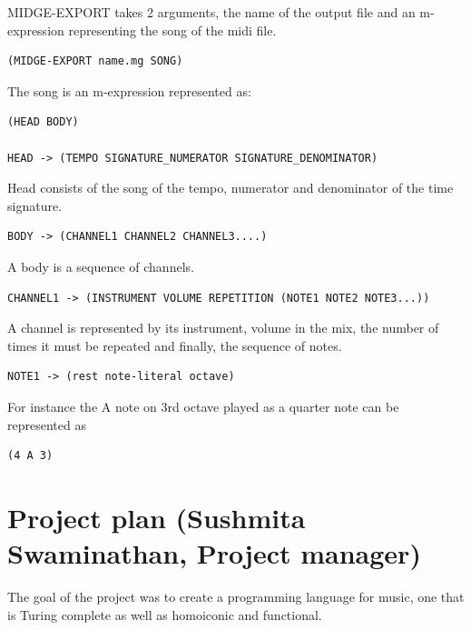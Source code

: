 \documentclass[letterpaper,11pt]{article}
\begin{document}
{MIDGE-EXPORT takes 2 arguments, the name of the output file and an m-expression representing the song of the midi file. 

\lstset{breaklines=true,language=Lisp}
\begin{lstlisting}
(MIDGE-EXPORT name.mg SONG)
\end{lstlisting}
The song is an m-expression represented as:

\lstset{breaklines=true,language=Lisp}
\begin{lstlisting}
(HEAD BODY)

HEAD -> (TEMPO SIGNATURE_NUMERATOR SIGNATURE_DENOMINATOR)
\end{lstlisting}

Head consists of the song of the tempo, numerator and denominator of the time signature.

\lstset{breaklines=true,language=Lisp}
\begin{lstlisting}
BODY -> (CHANNEL1 CHANNEL2 CHANNEL3....)

\end{lstlisting}
A body is a sequence of channels.

\lstset{breaklines=true,language=Lisp}
\begin{lstlisting}
CHANNEL1 -> (INSTRUMENT VOLUME REPETITION (NOTE1 NOTE2 NOTE3...))

\end{lstlisting}
A channel is represented by its instrument, volume in the mix, the number of times it must be repeated and finally, the sequence of notes.

\lstset{breaklines=true,language=Lisp}
\begin{lstlisting}
NOTE1 -> (rest note-literal octave)

\end{lstlisting}
For instance the A note on 3rd octave played as a quarter note can be
represented as

\lstset{breaklines=true,language=Lisp}
\begin{lstlisting}
(4 A 3)
\end{lstlisting}

\section{Project plan (Sushmita Swaminathan, Project manager)}

The goal of the project was to create a programming language for music, one that is Turing complete as well as homoiconic and functional.


}
\end{document}
